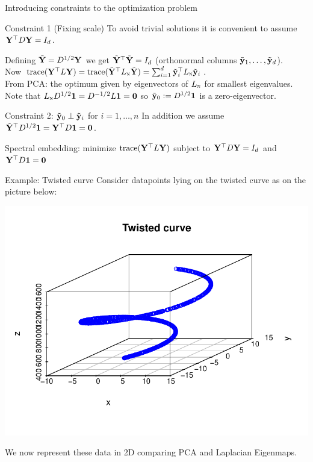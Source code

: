 \documentclass[11pt,handout,aspectratio=169]{beamer}
\begin{document}
\begin{frame}{Introducing constraints to the optimization problem}
	\begin{block}{Constraint 1 (Fixing scale)}
		To avoid trivial solutions it is convenient to assume $\mathbf{Y}^\top D \mathbf{Y}=I_d$.\\[2mm]
	\end{block}
Defining $\tilde{\mathbf{Y}}=D^{1/2}\mathbf{Y}$ we get $\tilde{\mathbf{Y}}^\top \tilde{\mathbf{Y}}=I_d$ (orthonormal \alert{columns} $\tilde{\mathbf{y}}_1,\ldots,\tilde{\mathbf{y}}_d$).\\[3mm]
Now $\text{trace}(\mathbf{Y}^\top L\mathbf{Y})=\text{trace}(\tilde{\mathbf{Y}}^\top L_{\textsc{n}}\tilde{\mathbf{Y}})=\sum_{i=1}^d \tilde{\mathbf{y}}_i^\top L_{\textsc{n}}\tilde{\mathbf{y}}_i$.\\[3mm]
From PCA: the optimum given by eigenvectors of $L_{\textsc{n}}$ for \alert{smallest} eigenvalues.\\[2mm] 
Note that $L_{\textsc{n}} D^{1/2}\boldsymbol 1=D^{-1/2}L\boldsymbol 1=\boldsymbol 0$ so $\tilde{\mathbf{y}}_0:=D^{1/2}\boldsymbol 1$ is a zero-eigenvector.
\begin{block}{Constraint 2: $\tilde{\mathbf{y}}_0\perp \tilde {\mathbf{y}}_i$ for $i=1,\ldots,n$}
		In addition we assume $\tilde{\mathbf{Y}}^\top D^{1/2}\boldsymbol 1=\mathbf{Y}^{\top} D \mathbf{1} = \mathbf{0}$.
\end{block}
\begin{alertblock}{}
\alert{Spectral embedding}:	minimize $\text{trace}(\mathbf{Y}^\top L \mathbf{Y})$ subject to $\mathbf{Y}^\top D\mathbf{Y}=I_d$ and $\mathbf{Y}^{\top} D \mathbf{1} = \mathbf{0}$
\end{alertblock}

\end{frame}


\begin{frame}{Example: Twisted curve}
Consider datapoints lying on the twisted curve as on the picture below:
	\begin{center}
		\includegraphics[scale=.7]{pics/twisted.pdf}
	\end{center}
We now represent these data in 2D comparing PCA and Laplacian Eigenmaps.
\end{frame}
\end{document}
